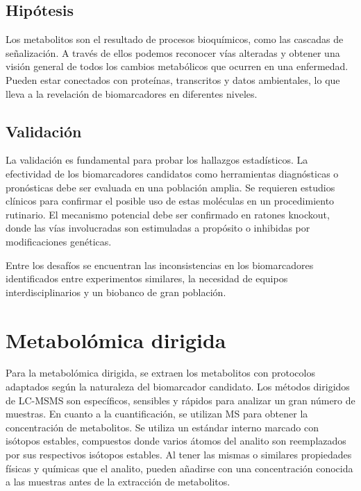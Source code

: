\subsection{Hipótesis}
Los metabolitos son el resultado de procesos bioquímicos, como las cascadas de señalización. A través de ellos podemos reconocer vías alteradas y obtener una visión general de todos los cambios metabólicos que ocurren en una enfermedad. Pueden estar conectados con proteínas, transcritos y datos ambientales, lo que lleva a la revelación de biomarcadores en diferentes niveles.

\subsection{Validación}
La validación es fundamental para probar los hallazgos estadísticos. La efectividad de los biomarcadores candidatos como herramientas diagnósticas o pronósticas debe ser evaluada en una población amplia. Se requieren estudios clínicos para confirmar el posible uso de estas moléculas en un procedimiento rutinario. El mecanismo potencial debe ser confirmado en ratones knockout, donde las vías involucradas son estimuladas a propósito o inhibidas por modificaciones genéticas.

Entre los desafíos se encuentran las inconsistencias en los biomarcadores identificados entre experimentos similares, la necesidad de equipos interdisciplinarios y un biobanco de gran población.

\section{Metabolómica dirigida}
Para la metabolómica dirigida, se extraen los metabolitos con protocolos adaptados según la naturaleza del biomarcador candidato. Los métodos dirigidos de LC-MSMS son específicos, sensibles y rápidos para analizar un gran número de muestras. En cuanto a la cuantificación, se utilizan MS para obtener la concentración de metabolitos. Se utiliza un estándar interno marcado con isótopos estables, compuestos donde varios átomos del analito son reemplazados por sus respectivos isótopos estables. Al tener las mismas o similares propiedades físicas y químicas que el analito, pueden añadirse con una concentración conocida a las muestras antes de la extracción de metabolitos. 